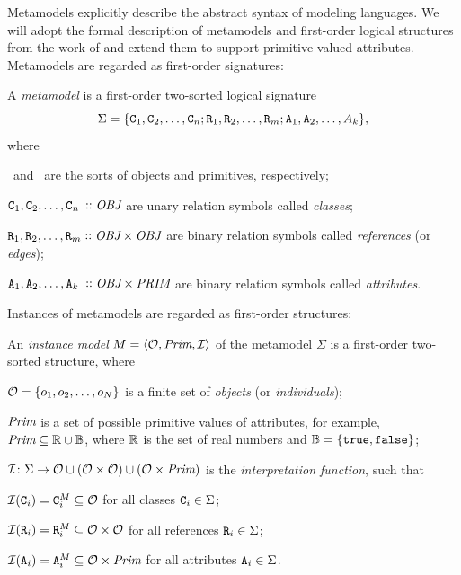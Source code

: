 Metamodels explicitly describe the abstract syntax of modeling languages. We will adopt the formal description of metamodels and first-order logical structures from the work of \citet{Varro17generation} and extend them to support primitive-valued attributes. Metamodels are regarded as first-order signatures:

\begin{dfn}
  A \emph{metamodel} is a first-order two-sorted logical signature
  \begin{equation}
    \Sigma = \{\texttt{\upshape C}_1, \texttt{\upshape C}_2, \ldots, \texttt{\upshape C}_n; \texttt{\upshape R}_1, \texttt{\upshape R}_2, \ldots, \texttt{\upshape R}_m; \texttt{\upshape A}_1, \texttt{\upshape A}_2, \ldots, A_k\} \text,
  \end{equation}
  where
  \begin{compactitem}
  \item \OBJsort\ and \PRIMsort\ are the sorts of objects and primitives, respectively;
  \item \(\lit C_1, \lit C_2, \ldots, \lit C_{\mathrlap{n}\phantom{m}} \ofkind \OBJsort\) are unary relation symbols called \emph{classes};
  \item \(\texttt{\upshape R}_1, \texttt{\upshape R}_2, \ldots, \texttt{\upshape R}_m \mathrel{\vcentcolon\vcentcolon} \textit{OBJ} \times \textit{OBJ}\) are binary relation symbols called \emph{references} (or \emph{edges});
  \item \(\lit A_1, \lit A_2, \ldots, \lit A_{\mathrlap{k}\phantom{m}} \ofkind \OBJsort \times \PRIMsort\) are binary relation symbols called \emph{attributes}.
  \end{compactitem}
\end{dfn}

Instances of metamodels are regarded as first-order structures:

\begin{dfn}
  An \emph{instance model} \(M = \langle \mathcal{O}, \textit{Prim}, \mathcal{I} \rangle\) of the metamodel \(\Sigma\) is a first-order two-sorted structure, where
  \begin{compactitem}
  \item \(\mathcal{O} = \{o_1, o_2, \ldots, o_N\}\) is a finite set of \emph{objects} (or \emph{individuals});
  \item \(\textit{Prim}\) is a set of possible primitive values of attributes, for example, \(\textit{Prim} \subseteq \mathbb{R} \cup \mathbb{B}\), where \(\mathbb{R}\) is the set of real numbers and \(\mathbb{B} = \{\texttt{\upshape true}, \texttt{\upshape false}\}\);
  \item \(\mathcal{I}\colon \Sigma \to \mathcal{O} \cup (\mathcal{O} \times \mathcal{O}) \cup (\mathcal{O} \times \textit{Prim})\) is the \emph{interpretation function}, such that
    \begin{compactitem}
    \item \(\mathcal{I}(\texttt{\upshape C}_i) = \texttt{\upshape C}_i^M \subseteq \mathcal{O}\) for all classes \(\texttt{\upshape C}_i \in \Sigma\);
    \item \(\mathcal{I}(\texttt{\upshape R}_i) = \texttt{\upshape R}_i^M \subseteq \mathcal{O} \times \mathcal{O}\) for all references \(\texttt{\upshape R}_i \in \Sigma\);
    \item \(\mathcal{I}(\texttt{\upshape A}_i) = \texttt{\upshape A}_i^M \subseteq \mathcal{O} \times \textit{Prim}\) for all attributes \(\texttt{\upshape A}_i \in \Sigma\).
    \end{compactitem}
  \end{compactitem}
\end{dfn}

